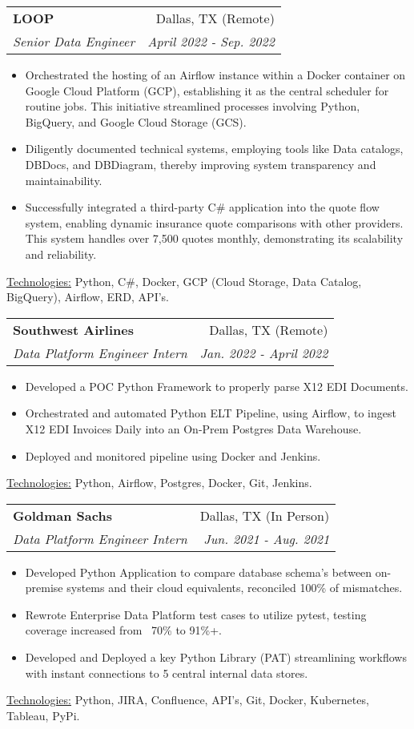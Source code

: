 \documentclass[11pt, a4paper]{article}
\makeatletter
\newcommand{\resumeItem}[1]{%
  \item\small{
    #1
  }
}
\newcommand{\resumeSubheading}[4]{
  \vspace{8pt}\item%
    \begin{tabular*}{0.97\textwidth}[t]{l@{\extracolsep{\fill}}r}
      \textbf{#1} & #2 \\
      \textit{\small#3} & \textit{\small #4} \\
    \end{tabular*}\vspace{-5pt}
}
\newcommand{\resumeItemListStart}{\begin{itemize}}
\newcommand{\resumeItemListEnd}{\end{itemize}\vspace{-5pt}}
\newcommand{\resumeTech}[2]{
 \underline{#1:} #2
}
\makeatother
\begin{document}

\resumeSubheading
      {LOOP}{Dallas, TX (Remote)}
      {Senior Data Engineer}{April 2022 - Sep. 2022}
      \resumeItemListStart
        \resumeItem{Orchestrated the hosting of an Airflow instance within a Docker container on Google Cloud Platform (GCP), establishing it as the central scheduler for routine jobs. This initiative streamlined processes involving Python, BigQuery, and Google Cloud Storage (GCS).}
        \resumeItem{Diligently documented technical systems, employing tools like Data catalogs, DBDocs, and DBDiagram, thereby improving system transparency and maintainability.}
        \resumeItem{Successfully integrated a third-party C# application into the quote flow system, enabling dynamic insurance quote comparisons with other providers. This system handles over 7,500 quotes monthly, demonstrating its scalability and reliability.}
      \resumeItemListEnd
      \resumeTech{Technologies}{Python, C\#, Docker, GCP (Cloud Storage, Data Catalog, BigQuery), Airflow, ERD, API's.}\\


\resumeSubheading
      {Southwest Airlines}{Dallas, TX (Remote)}
      {Data Platform Engineer Intern}{Jan. 2022 - April 2022}
      \resumeItemListStart
          \resumeItem{Developed a POC Python Framework to properly parse X12 EDI Documents.}
          \resumeItem{Orchestrated and automated Python ELT Pipeline, using Airflow, to ingest X12 EDI Invoices Daily into an On-Prem Postgres Data Warehouse.}
          \resumeItem{Deployed and monitored pipeline using Docker and Jenkins.}
      \resumeItemListEnd
      \resumeTech{Technologies}{Python, Airflow, Postgres, Docker, Git, Jenkins.}\\



\resumeSubheading
      {Goldman Sachs}{Dallas, TX (In Person)}
      {Data Platform Engineer Intern}{Jun. 2021 - Aug. 2021}
      \resumeItemListStart
      \resumeItem{Developed Python Application to compare database schema's between on-premise systems and their cloud equivalents, reconciled 100\% of mismatches.}
      \resumeItem{Rewrote Enterprise Data Platform test cases to utilize pytest, testing coverage increased from ~70\% to 91\%+.}
      \resumeItem{Developed and Deployed a key Python Library (PAT) streamlining workflows with instant connections to 5 central internal data stores.}
      \resumeItemListEnd
      \resumeTech{Technologies}{Python, JIRA, Confluence, API's, Git, Docker, Kubernetes, Tableau, PyPi.}\\
\end{document}
